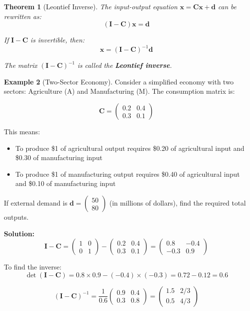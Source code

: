 \documentclass[12pt]{article}
\numberwithin{equation}{section}
\newcommand{\vect}[1]{\boldsymbol{#1}}   %
\newcommand{\mat}[1]{\mathbf{#1}}        %
\theoremstyle{plain}
\newtheorem{theorem}{Theorem}[section]
\theoremstyle{definition}
\newtheorem{example}[theorem]{Example}
\theoremstyle{remark}
\begin{document}
\begin{theorem}[Leontief Inverse]
The input-output equation $\vect{x} = \mat{C}\vect{x} + \vect{d}$ can be rewritten as:
$$(\mat{I} - \mat{C})\vect{x} = \vect{d}$$

If $\mat{I} - \mat{C}$ is invertible, then:
$$\vect{x} = (\mat{I} - \mat{C})^{-1}\vect{d}$$

The matrix $(\mat{I} - \mat{C})^{-1}$ is called the \textbf{Leontief inverse}.
\end{theorem}

\begin{example}[Two-Sector Economy]
Consider a simplified economy with two sectors: Agriculture (A) and Manufacturing (M). The consumption matrix is:

$$\mat{C} = \begin{pmatrix} 0.2 & 0.4 \\ 0.3 & 0.1 \end{pmatrix}$$

This means:
\begin{itemize}
\item To produce \$1 of agricultural output requires \$0.20 of agricultural input and \$0.30 of manufacturing input
\item To produce \$1 of manufacturing output requires \$0.40 of agricultural input and \$0.10 of manufacturing input
\end{itemize}

If external demand is $\vect{d} = \begin{pmatrix} 50 \\ 80 \end{pmatrix}$ (in millions of dollars), find the required total outputs.

\textbf{Solution:}
$$\mat{I} - \mat{C} = \begin{pmatrix} 1 & 0 \\ 0 & 1 \end{pmatrix} - \begin{pmatrix} 0.2 & 0.4 \\ 0.3 & 0.1 \end{pmatrix} = \begin{pmatrix} 0.8 & -0.4 \\ -0.3 & 0.9 \end{pmatrix}$$

To find the inverse:
$$\det(\mat{I} - \mat{C}) = 0.8 \times 0.9 - (-0.4) \times (-0.3) = 0.72 - 0.12 = 0.6$$

$$(\mat{I} - \mat{C})^{-1} = \frac{1}{0.6}\begin{pmatrix} 0.9 & 0.4 \\ 0.3 & 0.8 \end{pmatrix} = \begin{pmatrix} 1.5 & 2/3 \\ 0.5 & 4/3 \end{pmatrix}$$


\end{example}
\end{document}
